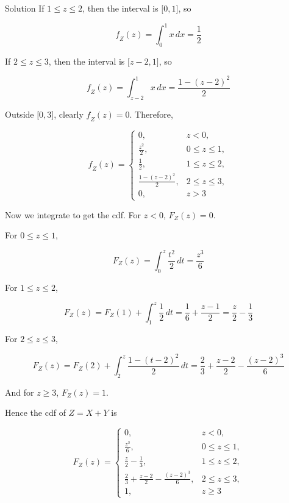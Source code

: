 \begin{qlsolution}{Solution}
If \(1 \leq \mathit{z} \leq 2\), then the interval is \(\lbrack 0,1\rbrack\), so

\[\mathit{f}_{\mathit{Z}}(\mathit{z}) = \int_{0}^{1}\mathit{x}\,\mathit{d}\mathit{x} = \frac{1}{2}\]

If \(2 \leq \mathit{z} \leq 3\), then the interval is \(\lbrack\mathit{z} - 2,1\rbrack\), so

\[\mathit{f}_{\mathit{Z}}(\mathit{z}) = \int_{\mathit{z} - 2}^{1}\mathit{x}\,\mathit{d}\mathit{x} = \frac{1 - (\mathit{z} - 2)^{2}}{2}\]

Outside \(\lbrack 0,3\rbrack\), clearly \(\mathit{f}_{\mathit{Z}}(\mathit{z}) = 0\). Therefore,

\[\mathit{f}_{\mathit{Z}}(\mathit{z}) = \left\{ \begin{matrix}
{0,} & {\mathit{z} < 0,} \\
{\frac{\mathit{z}^{2}}{2},} & {0 \leq \mathit{z} \leq 1,} \\
{\frac{1}{2},} & {1 \leq \mathit{z} \leq 2,} \\
{\frac{1 - (\mathit{z} - 2)^{2}}{2},} & {2 \leq \mathit{z} \leq 3,} \\
{0,} & {\mathit{z} > 3}
\end{matrix} \right.\]

Now we integrate to get the cdf. For \(\mathit{z} < 0\), \(\mathit{F}_{\mathit{Z}}(\mathit{z}) = 0\).

For \(0 \leq \mathit{z} \leq 1\),

\[\mathit{F}_{\mathit{Z}}(\mathit{z}) = \int_{0}^{\mathit{z}}\frac{\mathit{t}^{2}}{2}\,\mathit{d}\mathit{t} = \frac{\mathit{z}^{3}}{6}\]

For \(1 \leq \mathit{z} \leq 2\),

\[\mathit{F}_{\mathit{Z}}(\mathit{z}) = \mathit{F}_{\mathit{Z}}(1) + \int_{1}^{\mathit{z}}\frac{1}{2}\,\mathit{d}\mathit{t} = \frac{1}{6} + \frac{\mathit{z} - 1}{2} = \frac{\mathit{z}}{2} - \frac{1}{3}\]

For \(2 \leq \mathit{z} \leq 3\),

\[\mathit{F}_{\mathit{Z}}(\mathit{z}) = \mathit{F}_{\mathit{Z}}(2) + \int_{2}^{\mathit{z}}\frac{1 - (\mathit{t} - 2)^{2}}{2}\,\mathit{d}\mathit{t} = \frac{2}{3} + \frac{\mathit{z} - 2}{2} - \frac{(\mathit{z} - 2)^{3}}{6}\]

And for \(\mathit{z} \geq 3\), \(\mathit{F}_{\mathit{Z}}(\mathit{z}) = 1\).

Hence the cdf of \(\mathit{Z} = \mathit{X} + \mathit{Y}\) is

\[\mathit{F}_{\mathit{Z}}(\mathit{z}) = \left\{ \begin{matrix}
{0,} & {\mathit{z} < 0,} \\
{\frac{\mathit{z}^{3}}{6},} & {0 \leq \mathit{z} \leq 1,} \\
{\frac{\mathit{z}}{2} - \frac{1}{3},} & {1 \leq \mathit{z} \leq 2,} \\
{\frac{2}{3} + \frac{\mathit{z} - 2}{2} - \frac{(\mathit{z} - 2)^{3}}{6},} & {2 \leq \mathit{z} \leq 3,} \\
{1,} & {\mathit{z} \geq 3}
\end{matrix} \right.\]

\end{qlsolution}

